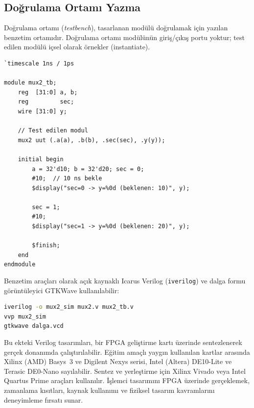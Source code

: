 \subsection{Doğrulama Ortamı Yazma}
\label{sec:ekd-testbench}

Doğrulama ortamı (\emph{testbench}), tasarlanan modülü doğrulamak için yazılan benzetim ortamıdır. Doğrulama ortamı modülünün giriş/çıkış portu yoktur; test edilen modülü içsel olarak örnekler (instantiate).

\begin{lstlisting}[style=verilog, caption={2'ye 1 çoklayıcı doğrulama ortamı örneği}, label={lst:ekd-testbench}]
`timescale 1ns / 1ps

module mux2_tb;
    reg  [31:0] a, b;
    reg         sec;
    wire [31:0] y;

    // Test edilen modul
    mux2 uut (.a(a), .b(b), .sec(sec), .y(y));

    initial begin
        a = 32'd10; b = 32'd20; sec = 0;
        #10;  // 10 ns bekle
        $display("sec=0 -> y=%0d (beklenen: 10)", y);

        sec = 1;
        #10;
        $display("sec=1 -> y=%0d (beklenen: 20)", y);

        $finish;
    end
endmodule
\end{lstlisting}

Benzetim araçları olarak açık kaynaklı Icarus Verilog (\texttt{iverilog}) ve dalga formu görüntüleyici GTKWave kullanılabilir:

\begin{lstlisting}[language=bash, numbers=none, caption={Icarus Verilog ile benzetim}]
iverilog -o mux2_sim mux2.v mux2_tb.v
vvp mux2_sim
gtkwave dalga.vcd
\end{lstlisting}

\begin{bilginot}
Bu ekteki Verilog tasarımları, bir FPGA geliştirme kartı üzerinde sentezlenerek gerçek donanımda çalıştırılabilir. Eğitim amaçlı yaygın kullanılan kartlar arasında Xilinx (AMD) Basys~3 ve Digilent Nexys serisi, Intel (Altera) DE10-Lite ve Terasic DE0-Nano sayılabilir. Sentez ve yerleştirme için Xilinx Vivado veya Intel Quartus Prime araçları kullanılır. İşlemci tasarımını FPGA üzerinde gerçeklemek, zamanlama kısıtları, kaynak kullanımı ve fiziksel tasarım kavramlarını deneyimleme fırsatı sunar.
\end{bilginot}


